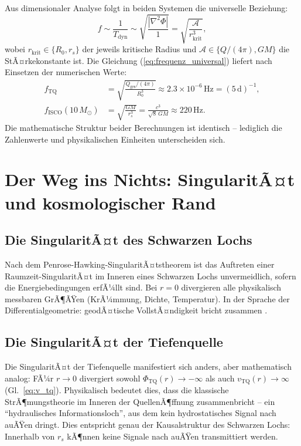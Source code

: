 ﻿\documentclass[12pt,a4paper]{report}
\begin{document}
Aus dimensionaler Analyse folgt in beiden Systemen die universelle Beziehung:
\begin{equation}
	f \sim \frac{1}{T_{\mathrm{dyn}}} \sim \sqrt{\frac{|\nabla^2\Phi|}{1}} = \sqrt{\frac{\mathcal{A}}{r_{\mathrm{krit}}^3}},
	\label{eq:frequenz_universal}
\end{equation}
wobei $r_{\mathrm{krit}} \in \{R_0, r_s\}$ der jeweils kritische Radius und $\mathcal{A} \in \{Q/(4\pi), GM\}$ die StÃ¤rke\-konstante ist. Die Gleichung (\ref{eq:frequenz_universal}) liefert nach Einsetzen der numerischen Werte:
\begin{align}
	f_{\mathrm{TQ}} &= \sqrt{\frac{Q_{\mathrm{ges}}/(4\pi)}{R_0^3}} \approx 2.3 \times 10^{-6}\,\mathrm{Hz} = (5\,\mathrm{d})^{-1}, \\
	f_{\mathrm{ISCO}}(10\,M_\odot) &= \sqrt{\frac{GM}{r_s^3}} = \frac{c^3}{\sqrt{8}\,GM} \approx 220\,\mathrm{Hz}.
\end{align}
Die mathematische Struktur beider Berechnungen ist identisch -- lediglich die Zahlenwerte und physikalischen Einheiten unterscheiden sich.

\section{Der Weg ins Nichts: SingularitÃ¤t und kosmologischer Rand}

\subsection{Die SingularitÃ¤t des Schwarzen Lochs}

Nach dem Penrose-Hawking-SingularitÃ¤tstheorem \cite{penrose1965,hawking1972} ist das Auftreten einer Raumzeit-SingularitÃ¤t im Inneren eines Schwarzen Lochs unvermeidlich, sofern die Energiebedingungen erfÃ¼llt sind. Bei $r = 0$ divergieren alle physikalisch messbaren GrÃ¶ÃŸen (KrÃ¼mmung, Dichte, Temperatur). In der Sprache der Differentialgeometrie: geodÃ¤tische VollstÃ¤ndigkeit bricht zusammen \cite{penrose2004}.

\subsection{Die SingularitÃ¤t der Tiefenquelle}

Die SingularitÃ¤t der Tiefenquelle manifestiert sich anders, aber mathematisch analog: FÃ¼r $r \to 0$ divergiert sowohl $\Phi_{\mathrm{TQ}}(r) \to -\infty$ als auch $v_{\mathrm{TQ}}(r) \to \infty$ (Gl.~\ref{eq:v_tq}). Physikalisch bedeutet dies, dass die klassische StrÃ¶mungstheorie im Inneren der QuellenÃ¶ffnung zusammenbricht -- ein ``hydraulisches Informationsloch'', aus dem kein hydrostatisches Signal nach auÃŸen dringt. Dies entspricht genau der Kausalstruktur des Schwarzen Lochs: Innerhalb von $r_s$ kÃ¶nnen keine Signale nach auÃŸen transmittiert werden.
\end{document}
